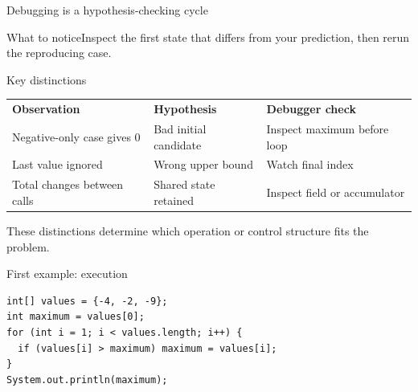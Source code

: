 \documentclass[10pt,aspectratio=169]{beamer}
\begin{document}
\begin{frame}[fragile,t]{Debugging is a hypothesis-checking cycle}
\begin{center}\end{center}
\begin{block}{What to notice}Inspect the first state that differs from your prediction, then rerun the reproducing case.\end{block}
\end{frame}
\begin{frame}[fragile,t]{Key distinctions}
\small\renewcommand{\arraystretch}{1.5}
\begin{tabularx}{\textwidth}{>{\raggedright\arraybackslash}X>{\raggedright\arraybackslash}X>{\raggedright\arraybackslash}X}
\rowcolor{navy}
\color{white}\bfseries Observation & \color{white}\bfseries Hypothesis & \color{white}\bfseries Debugger check\\
Negative-only case gives 0 & Bad initial candidate & Inspect maximum before loop\\
Last value ignored & Wrong upper bound & Watch final index\\
Total changes between calls & Shared state retained & Inspect field or accumulator\\
\end{tabularx}
\vspace{3mm}\footnotesize These distinctions determine which operation or control structure fits the problem.
\end{frame}

\begin{frame}[fragile,t]{First example: execution}
\begin{lstlisting}
int[] values = {-4, -2, -9};
int maximum = values[0];
for (int i = 1; i < values.length; i++) {
  if (values[i] > maximum) maximum = values[i];
}
System.out.println(maximum);
\end{lstlisting}
\end{frame}
\end{document}
